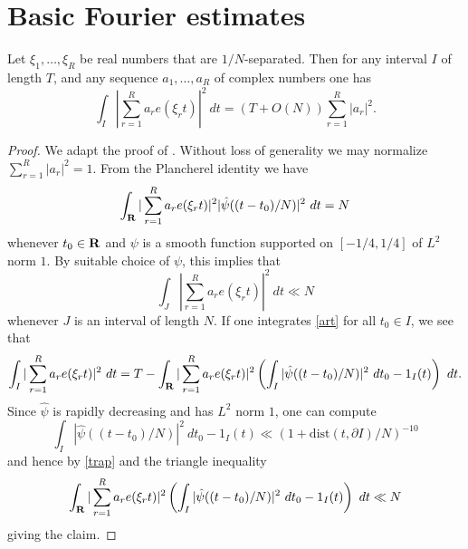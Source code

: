 \chapter{Basic Fourier estimates}\label{l2-chapter}

\begin{lemma}\label{l2-int}  Let $\xi_1,\dots,\xi_R$ be real numbers that are $1/N$-separated.  Then for any interval $I$ of length $T$, and any sequence $a_1,\dots,a_R$ of complex numbers one has
$$ \int_I |\sum_{r=1}^R a_r e(\xi_r t)|^2\ dt = (T + O(N)) \sum_{r=1}^R |a_r|^2.$$
\end{lemma}

\begin{proof} We adapt the proof of \cite[Theorem 9.1]{ik}.  Without loss of generality we may normalize
    $\sum_{r=1}^R |a_r|^2=1$.    From the Plancherel identity we have
\begin{equation}\label{art}
 \int_{\mathbf{R}} |\sum_{r=1}^R a_r e(\xi_r t)|^2 |\hat \psi((t-t_0)/N)|^2\ dt = N
 \end{equation}
whenever $t_0 \in \mathbf{R}$ and $\psi$ is a smooth function supported on $[-1/4, 1/4]$ of $L^2$ norm $1$.   By suitable choice of $\psi$, this implies that
\begin{equation}\label{trap}
 \int_J |\sum_{r=1}^R a_r e(\xi_r t)|^2\ dt \ll N
\end{equation}
whenever $J$ is an interval of length $N$.  If one integrates \eqref{art} for all $t_0 \in I$, we see that
$$ \int_I |\sum_{r=1}^R a_r e(\xi_r t)|^2\ dt = T - \int_\R |\sum_{r=1}^R a_r e(\xi_r t)|^2 \left(\int_I |\hat \psi((t-t_0)/N)|^2\ dt_0 - 1_I(t)\right)\ dt.$$
Since $\hat \psi$ is rapidly decreasing and has $L^2$ norm $1$, one can compute
$$ \int_I |\hat \psi((t-t_0)/N)|^2\ dt_0 - 1_I(t) \ll (1 + \mathrm{dist}(t, \partial I) / N)^{-10}$$
and hence by \eqref{trap} and the triangle inequality
$$ \int_{\mathbf{R}} |\sum_{r=1}^R a_r e(\xi_r t)|^2 \left(\int_I |\hat \psi((t-t_0)/N)|^2\ dt_0 - 1_I(t)\right)\ dt \ll N$$
giving the claim.
\end{proof}
